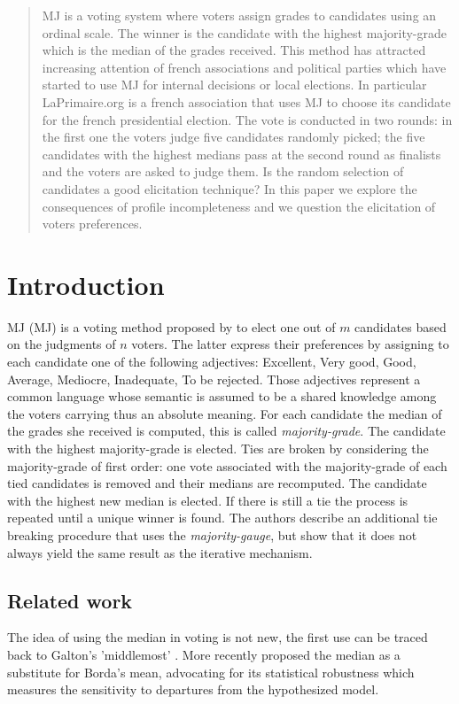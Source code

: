 \begin{abstract}
	\ac{MJ} is a voting system where voters assign grades to candidates using an ordinal scale. The winner is the candidate with the highest majority-grade \textemdash which is the median of the grades received. This method has attracted increasing attention of french associations and political parties which have started to use \ac{MJ} for internal decisions or local elections. In particular LaPrimaire.org is a french association that uses \ac{MJ} to choose its candidate for the french presidential election. The vote is conducted in two rounds: in the first one the voters judge five candidates randomly picked; the five candidates with the highest medians pass at the second round as finalists and the voters are asked to judge them. Is the random selection of candidates a good elicitation technique? In this paper we explore the consequences of profile incompleteness and we question the elicitation of voters preferences.
\end{abstract}

\section{Introduction}
\label{sec:intro}
\acrlong{MJ} (\ac{MJ}) is a voting method proposed by \citet{Balinski2007,Balinski2011} to elect one out of $m$ candidates based on the judgments of $n$ voters. The latter express their preferences by assigning to each candidate one of the following adjectives: Excellent, Very good, Good, Average, Mediocre, Inadequate, To be rejected. Those adjectives represent a common language whose semantic is assumed to be a shared knowledge among the voters carrying thus an absolute meaning. For each candidate the median of the grades she received is computed, this is called \textit{majority-grade}. The candidate with the highest majority-grade is elected. Ties are broken by considering the majority-grade of first order: one vote associated with the majority-grade of each tied candidates is removed and their medians are recomputed. The candidate with the highest new median is elected. If there is still a tie the process is repeated until a unique winner is found. The authors describe an additional tie breaking procedure that uses the \textit{majority-gauge}, but \citet{Felsenthal2008} show that it does not always yield the same result as the iterative mechanism.

\subsection{Related work}
The idea of using the median in voting is not new, the first use can be traced back to Galton's 'middlemost' \citep{Galton1907a,Galton1907b}. More recently \citet{Bassett1999} proposed the median as a substitute for Borda's mean, advocating for its statistical robustness \textemdash which measures the sensitivity to departures from the hypothesized model.

